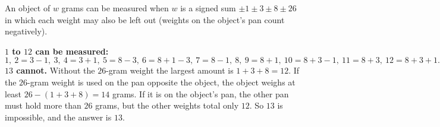 An object of $w$ grams can be measured when $w$ is a signed sum $\pm1\pm3\pm8\pm26$ in which each weight may also be left out (weights on the object's pan count negatively).

\textbf{$1$ to $12$ can be measured:}
\[
1,\ 2=3-1,\ 3,\ 4=3+1,\ 5=8-3,\ 6=8+1-3,\ 7=8-1,\ 8,\ 9=8+1,\ 10=8+3-1,\ 11=8+3,\ 12=8+3+1 .
\]
\textbf{$13$ cannot.} Without the $26$-gram weight the largest amount is $1+3+8=12$. If the $26$-gram weight is used on the pan opposite the object, the object weighs at least $26-(1+3+8)=14$ grams. If it is on the object's pan, the other pan must hold more than $26$ grams, but the other weights total only $12$. So $13$ is impossible, and the answer is $\boxed{13}$.
